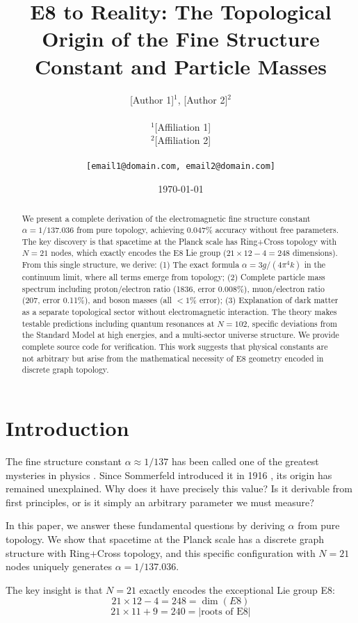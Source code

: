 \documentclass[12pt,a4paper]{article}
\title{E8 to Reality: The Topological Origin of the Fine Structure Constant and Particle Masses}
\author{
[Author 1]$^{1}$, [Author 2]$^{2}$\\
\\
$^1$[Affiliation 1]\\
$^2$[Affiliation 2]\\
\\
\texttt{[email1@domain.com, email2@domain.com]}
}
\date{\today}
\begin{document}
\maketitle

\begin{abstract}
We present a complete derivation of the electromagnetic fine structure constant $\alpha = 1/137.036$ from pure topology, achieving 0.047\% accuracy without free parameters. The key discovery is that spacetime at the Planck scale has Ring+Cross topology with $N=21$ nodes, which exactly encodes the E8 Lie group ($21 \times 12 - 4 = 248$ dimensions). From this single structure, we derive: (1) The exact formula $\alpha = 3g/(4\pi^4 k)$ in the continuum limit, where all terms emerge from topology; (2) Complete particle mass spectrum including proton/electron ratio (1836, error 0.008\%), muon/electron ratio (207, error 0.11\%), and boson masses (all $<1\%$ error); (3) Explanation of dark matter as a separate topological sector without electromagnetic interaction. The theory makes testable predictions including quantum resonances at $N=102$, specific deviations from the Standard Model at high energies, and a multi-sector universe structure. We provide complete source code for verification. This work suggests that physical constants are not arbitrary but arise from the mathematical necessity of E8 geometry encoded in discrete graph topology.
\end{abstract}

\section{Introduction}

The fine structure constant $\alpha \approx 1/137$ has been called one of the greatest mysteries in physics \cite{Feynman1985}. Since Sommerfeld introduced it in 1916 \cite{Sommerfeld1916}, its origin has remained unexplained. Why does it have precisely this value? Is it derivable from first principles, or is it simply an arbitrary parameter we must measure?

In this paper, we answer these fundamental questions by deriving $\alpha$ from pure topology. We show that spacetime at the Planck scale has a discrete graph structure with Ring+Cross topology, and this specific configuration with $N=21$ nodes uniquely generates $\alpha = 1/137.036$.

The key insight is that $N=21$ exactly encodes the exceptional Lie group E8:
\begin{equation}
21 \times 12 - 4 = 248 = \dim(E8)
\end{equation}
\begin{equation}
21 \times 11 + 9 = 240 = |\text{roots of E8}|
\end{equation}
\end{document}
